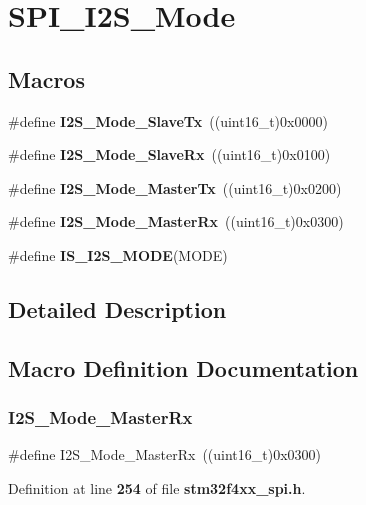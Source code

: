 \section{S\+P\+I\+\_\+\+I2\+S\+\_\+\+Mode}
\label{group__SPI__I2S__Mode}
\subsection*{Macros}
\begin{DoxyCompactItemize}
\item 
\#define \textbf{ I2\+S\+\_\+\+Mode\+\_\+\+Slave\+Tx}~((uint16\+\_\+t)0x0000)
\item 
\#define \textbf{ I2\+S\+\_\+\+Mode\+\_\+\+Slave\+Rx}~((uint16\+\_\+t)0x0100)
\item 
\#define \textbf{ I2\+S\+\_\+\+Mode\+\_\+\+Master\+Tx}~((uint16\+\_\+t)0x0200)
\item 
\#define \textbf{ I2\+S\+\_\+\+Mode\+\_\+\+Master\+Rx}~((uint16\+\_\+t)0x0300)
\item 
\#define \textbf{ I\+S\+\_\+\+I2\+S\+\_\+\+M\+O\+DE}(M\+O\+DE)
\end{DoxyCompactItemize}


\subsection{Detailed Description}


\subsection{Macro Definition Documentation}
\mbox{\label{group__SPI__I2S__Mode_gabf9f872cda7c0f159c5fc18aed44e973}} 
\subsubsection{I2\+S\+\_\+\+Mode\+\_\+\+Master\+Rx}
{\footnotesize\ttfamily \#define I2\+S\+\_\+\+Mode\+\_\+\+Master\+Rx~((uint16\+\_\+t)0x0300)}



Definition at line \textbf{ 254} of file \textbf{ stm32f4xx\+\_\+spi.\+h}.

\mbox{\label{group__SPI__I2S__Mode_ga3a62ee8964033a3f6fd030da9e40fba6}} 
